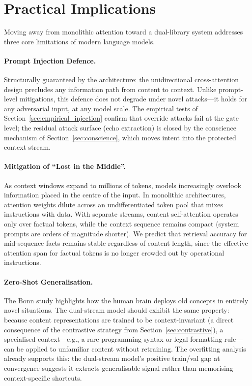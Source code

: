 \documentclass[11pt,a4paper]{article}
\theoremstyle{definition}
\begin{document}
\section{Practical Implications}

Moving away from monolithic attention toward a dual-library system addresses three core limitations of modern language models.

\paragraph{Prompt Injection Defence.}
Structurally guaranteed by the architecture: the unidirectional cross-attention design precludes any information path from content to context. Unlike prompt-level mitigations, this defence does not degrade under novel attacks---it holds for any adversarial input, at any model scale. The empirical tests of Section~\ref{sec:empirical_injection} confirm that override attacks fail at the gate level; the residual attack surface (echo extraction) is closed by the conscience mechanism of Section~\ref{sec:conscience}, which moves intent into the protected context stream.

\paragraph{Mitigation of ``Lost in the Middle''.}
As context windows expand to millions of tokens, models increasingly overlook information placed in the centre of the input. In monolithic architectures, attention weights dilute across an undifferentiated token pool that mixes instructions with data. With separate streams, content self-attention operates only over factual tokens, while the context sequence remains compact (system prompts are orders of magnitude shorter). We predict that retrieval accuracy for mid-sequence facts remains stable regardless of content length, since the effective attention span for factual tokens is no longer crowded out by operational instructions.

\paragraph{Zero-Shot Generalisation.}
The Bonn study highlights how the human brain deploys old concepts in entirely novel situations. The dual-stream model should exhibit the same property: because content representations are trained to be context-invariant (a direct consequence of the contrastive strategy from Section~\ref{sec:contrastive}), a specialised context---e.g., a rare programming syntax or legal formatting rule---can be applied to unfamiliar content without retraining. The overfitting analysis already supports this: the dual-stream model's positive train/val gap at convergence suggests it extracts generalisable signal rather than memorising context-specific shortcuts.
\end{document}
